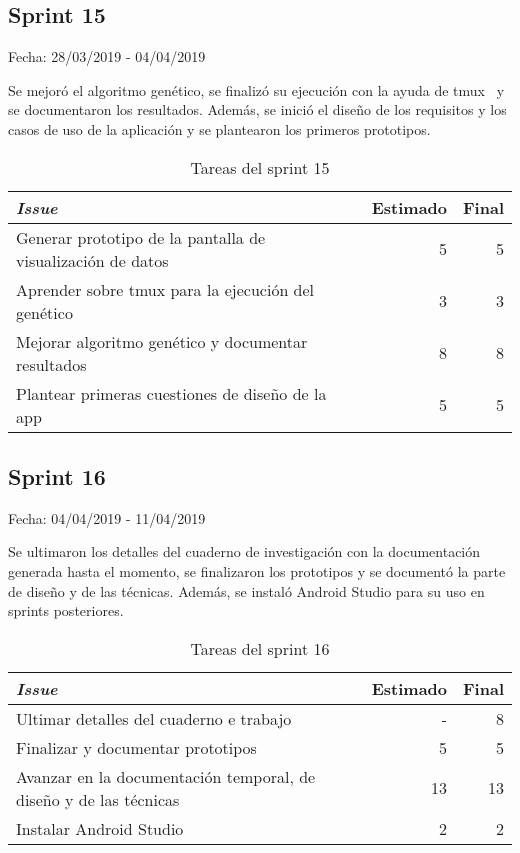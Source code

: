 \subsection{Sprint 15}

Fecha: 28/03/2019 - 04/04/2019

Se mejoró el algoritmo genético, se finalizó su ejecución con la ayuda de tmux~\cite{tmux} y se documentaron los resultados. Además, se inició el diseño de los requisitos y los casos de uso de la aplicación y se plantearon los primeros prototipos. 

\begin{table}[H]
	\begin{tabularx}{\textwidth}{Xrr}
		\toprule \textbf{\textit{Issue}} & \textbf{Estimado} & \textbf{Final}\\
		\toprule 
		Generar prototipo de la pantalla de visualización de datos & 5 & 5 \\
		Aprender sobre tmux para la ejecución del genético & 3 & 3 \\
		Mejorar algoritmo genético y documentar resultados & 8 & 8 \\
		Plantear primeras cuestiones de diseño de la app & 5 & 5 \\
		\bottomrule
	\end{tabularx}
	\caption{Tareas del sprint 15}
\end{table}

\subsection{Sprint 16}

Fecha: 04/04/2019 - 11/04/2019

Se ultimaron los detalles del cuaderno de investigación con la documentación generada hasta el momento, se finalizaron los prototipos y se documentó la parte de diseño y de las técnicas. Además, se instaló Android Studio para su uso en sprints posteriores. 


\begin{table}[H]
	\begin{tabularx}{\textwidth}{Xrr}
		\toprule \textbf{\textit{Issue}} & \textbf{Estimado} & \textbf{Final}\\
		\toprule
		Ultimar detalles del cuaderno e trabajo & - & 8 \\
		Finalizar y documentar prototipos & 5 & 5 \\
		Avanzar en la documentación temporal, de diseño y de las técnicas & 13 & 13 \\
		Instalar Android Studio & 2 & 2 \\
		\bottomrule
	\end{tabularx}
	\caption{Tareas del sprint 16}
\end{table}

